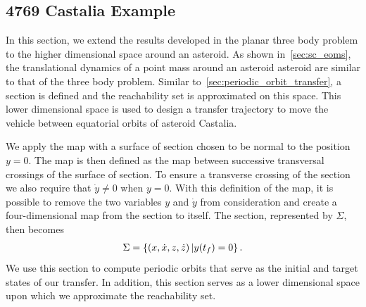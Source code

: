 \subsection{4769 Castalia Example}\label{sec:castalia_transfer}

In this section, we extend the results developed in the planar three body problem to the higher dimensional space around an asteroid.
As shown in~\cref{sec:sc_eoms}, the translational dynamics of a point mass around an asteroid asteroid are similar to that of the three body problem.
Similar to~\cref{sec:periodic_orbit_transfer}, a \Poincare section is defined and the reachability set is approximated on this space. 
This lower dimensional space is used to design a transfer trajectory to move the vehicle between equatorial orbits of asteroid Castalia.

We apply the \Poincare map with a surface of section chosen to be normal to the position \( y = 0 \).
The \Poincare map is then defined as the map between successive transversal crossings of the surface of section.
To ensure a transverse crossing of the section we also require that \( \dot{y} \neq 0 \) when \( y = 0 \).
With this definition of the \Poincare map, it is possible to remove the two variables \( y \) and \( \dot{y} \) from consideration and create a four-dimensional map from the \Poincare section to itself.
The \Poincare section, represented by \( \Sigma \), then becomes
\begin{align}\label{eq:poincare_section}
    \Sigma = \left\{ \left( x, \dot{x}, z, \dot{z} \right) | y(t_f) = 0  \right\}.
\end{align}
We use this section to compute periodic orbits that serve as the initial and target states of our transfer.
In addition, this section serves as a lower dimensional space upon which we approximate the reachability set.

